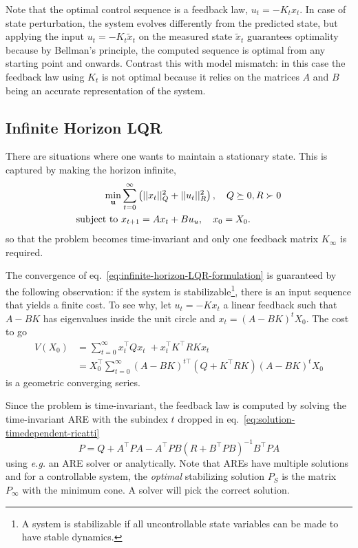Note that the optimal control sequence is a feedback law, $u_t=-K_tx_t$. In case of state perturbation, the system evolves differently from the predicted state, but applying the input $u_t=-K_t\tilde{x}_t$ on the measured state $\tilde{x}_t$ guarantees optimality because by Bellman's principle, the computed sequence is optimal from any starting point and onwards. Contrast this with model mismatch: in this case the feedback law using $K_t$ is not optimal because it relies on the matrices $A$ and $B$ being an accurate representation of the system.

\subsection{Infinite Horizon LQR}
\label{sec:infinite-horizon-LQR}

There are situations where one wants to maintain a stationary state. This is captured by making the horizon infinite,
\begin{equation}
  \label{eq:infinite-horizon-LQR-formulation}
  \begin{aligned}
\min_{\boldsymbol{\mathrm{u}}} &\sum_{t=0}^\infty \left(||x_t||_Q^2 + ||u_t||_R^2 \right),\quad Q\succeq 0, R\succ 0 \\
    \text{subject to } &x_{t+1} = Ax_t + Bu_u,\quad x_0=X_0.
  \end{aligned}
\end{equation}
so that the problem becomes time-invariant and only one feedback matrix $K_\infty$ is required.

The convergence of eq.~\eqref{eq:infinite-horizon-LQR-formulation} is guaranteed by the following observation: if the system is stabilizable\footnote{A system is stabilizable if all uncontrollable state variables can be made to have stable dynamics.}, there is an input sequence that yields a finite cost. To see why, let $u_t = -Kx_t$ a linear feedback such that $A-BK$ has eigenvalues inside the unit circle and $x_t=(A-BK)^tX_0$. The cost to go
\begin{align*}
  V(X_0) &= \sum_{t=0}^\infty x_t^\top Qx_t^{\phantom{\top}} + x_t^\top K^\top RKx_t \\
         &= X_0^\top \sum_{t=0}^\infty (A-BK)^{t\top}\left(Q+K^\top RK\right)(A-BK)^tX_0
\end{align*}
is a geometric converging series.

Since the problem is time-invariant, the feedback law is computed by solving the time-invariant ARE with the subindex $t$ dropped in eq.~\eqref{eq:solution-timedependent-ricatti}
\begin{equation*}
  P = Q + A^\top P A - A^\top P B\left(R + B^\top PB\right)^{-1}B^\top P A
\end{equation*}
using \textit{e.g.} an ARE solver or analytically. Note that AREs have multiple solutions and for a controllable system, the \emph{optimal} stabilizing solution $P_S$ is the matrix $P_\infty$ with the minimum cone. A solver will pick the correct solution.

